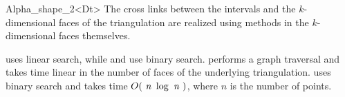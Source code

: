 \begin{ccRefClass} {Alpha_shape_2<Dt>}
The cross links between the intervals and the $k$-dimensional faces of the
triangulation are realized using methods in the $k$-dimensional faces
themselves.

 uses linear search, while 
 and  
use binary search.
 performs a graph traversal and takes time
linear in the number of faces of the underlying triangulation.
 uses binary search and takes time
$O(\mbox{ \em n } \log{\mbox{ \em n } })$, where  $n$ is the number of points.

\end{ccRefClass}

